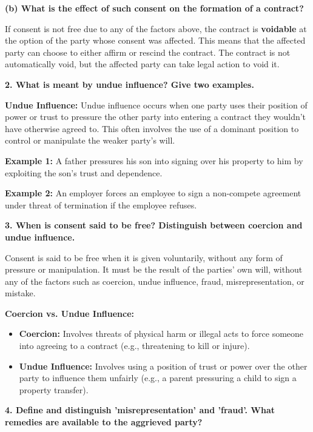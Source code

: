 \documentclass[12pt,a4paper]{book}
\begin{document}
\textbf{(b) What is the effect of such consent on the formation of a contract?}  

If consent is not free due to any of the factors above, the contract is \textbf{voidable} at the option of the party whose consent was affected. This means that the affected party can choose to either affirm or rescind the contract. The contract is not automatically void, but the affected party can take legal action to void it.

\vspace{0.5cm}
\textbf{2. What is meant by undue influence? Give two examples.}  

\textbf{Undue Influence:}  
Undue influence occurs when one party uses their position of power or trust to pressure the other party into entering a contract they wouldn’t have otherwise agreed to. This often involves the use of a dominant position to control or manipulate the weaker party’s will.  

\textbf{Example 1:}  
A father pressures his son into signing over his property to him by exploiting the son’s trust and dependence.

\textbf{Example 2:}  
An employer forces an employee to sign a non-compete agreement under threat of termination if the employee refuses.

\vspace{0.5cm}
\textbf{3. When is consent said to be free? Distinguish between coercion and undue influence.}  

Consent is said to be free when it is given voluntarily, without any form of pressure or manipulation. It must be the result of the parties' own will, without any of the factors such as coercion, undue influence, fraud, misrepresentation, or mistake.  

\textbf{Coercion vs. Undue Influence:}  
\begin{itemize}
    \item \textbf{Coercion:} Involves threats of physical harm or illegal acts to force someone into agreeing to a contract (e.g., threatening to kill or injure).
    \item \textbf{Undue Influence:} Involves using a position of trust or power over the other party to influence them unfairly (e.g., a parent pressuring a child to sign a property transfer).
\end{itemize}

\vspace{0.5cm}
\textbf{4. Define and distinguish 'misrepresentation' and 'fraud'. What remedies are available to the aggrieved party?}  
\end{document}
